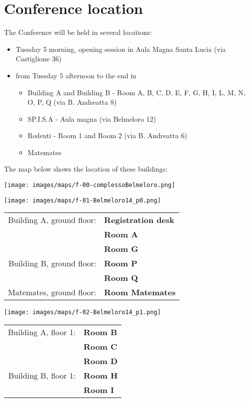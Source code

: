 \section*{Conference location}
The Conference will be held in several locations: 

\begin{itemize}
  \item Tuesday 5 morning, opening session in Aula Magna Santa Lucia (via Castiglione 36)
  \item from Tuesday 5 afternoon to the end in
\begin{itemize}
\item Building A and Building B - Room A, B, C, D, E, F, G, H, I, L, M, N, O, P, Q (via B. Andreatta 8)
\item SP.I.S.A - Aula magna (via Belmeloro 12)
\item Redenti - Room 1 and Room 2 (via B. Andreatta 6)
\item Matemates
\end{itemize}
\end{itemize}

\bigskip

\noindent The map below shows the location of these buildings:

\bigskip

\texttt{[image: images/maps/f-00-complessoBelmeloro.png]}

\newpage
\hspace*{-1cm}
\texttt{[image: images/maps/f-01-Belmeloro14\_p0.png]}
\vfill

\hfill
\colorbox{siamblue!50}{\large
\begin{tabular}{ r l }
  Building A, ground floor: & \textbf{Registration desk} \\
                            & \textbf{Room A} \\
                            & \textbf{Room G} \\
  Building B, ground floor: & \textbf{Room P} \\
                            & \textbf{Room Q} \\
  Matemates, ground floor:  & \textbf{Room Matemates}
\end{tabular}
}

\newpage
\hspace*{-1cm}
\texttt{[image: images/maps/f-02-Belmeloro14\_p1.png]}
\vfill

\hfill
\colorbox{siamblue!50}{\large
\begin{tabular}{ r l }
  Building A, floor 1: & \textbf{Room B} \\
                       & \textbf{Room C} \\
                       & \textbf{Room D} \\
  Building B, floor 1: & \textbf{Room H} \\
                       & \textbf{Room I}
\end{tabular}
}

